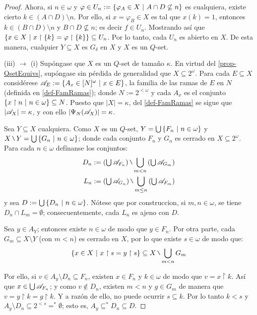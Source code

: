 \begin{proof}
        Ahora, si $n \in \omega$ y $\varphi \in U_n:=\{\varphi_A \in X \text{ $|$ } A \cap D \not\subseteq n\}$ es cualquiera, existe cierto $k \in (A \cap D) \setminus n$. Por ello, si $x=\varphi_B \in X$ es tal que $x(k)=1$, entonces $k \in (B \cap D) \setminus n$ y $B \cap D \not \subseteq n$; es decir $f \in U_n$. Mostrando así que $\{ x \in X \text{ $|$ } x\upharpoonright \{k\} = \varphi \upharpoonright \{k\} \} \subseteq U_n$. Por lo tanto, cada $U_n$ es abierto en $X$. De esta manera, cualquier $Y \subseteq X$ es $G_\delta$ en $X$ y $X$ es un $Q$-set.

        (iii) $\to$ (i) Supóngase que $X$ es un $Q$-set de tamaño $\kappa$. En virtud del \autoref{prop-QsetEquivs}, supóngase sin pérdida de generalidad que $X \subseteq 2^\omega$. Para cada $E \subseteq X$ considérese $ \mathscr{A}_E:=\{ A_x \in [N]^\omega \text{ $|$ } x \in E \} $, la familia de las ramas de $E$ en $N$ (definida en \ref{def-FamRamas}); donde $N:=2^{<\omega}$ y cada $A_x$ es el conjunto $\{x \upharpoonright n \text{ $|$ } n \in \omega\} \subseteq N$. Puesto que $|X|=\kappa$, del \autoref{def-FamRamas} se sigue que $|\mathscr{A}_X|=\kappa$, y con ello $|\Psi_N(\mathscr{A}_X)|=\kappa$.
        
        Sea $Y \subseteq X$ cualquiera. Como $X$ es un $Q$-set, $Y=\mbox{$\bigcup$}\,\{F_n \text{ $|$ } n \in \omega\}$ y $X \setminus Y=\midcup\{G_n \tq n\in \omega\}$; donde cada conjunto $F_n$ y $G_n$ es cerrado en $X\subseteq 2^\omega$. Para cada $n \in \omega$ defínanse los conjuntos:
        \begin{align*}
            D_n := \left( \midcup \ms{A}_{F_n} \right) \setminus \bigcup_{m<n} \left( \midcup \ms{A}_{G_m} \right) \\
            L_n := \left( \midcup \ms{A}_{G_n} \right) \setminus \bigcup_{m\leq n} \left( \midcup \ms{A}_{F_m} \right) 
        \end{align*}
        y sea $D:=\mbox{$\bigcup$}\,\{D_n \text{ $|$ } n \in \omega\}$. Nótese que por construccion, si $m,n \in \omega$, se tiene $D_n \cap L_m = \emptyset$; consecuentemente, cada $L_n$ es ajeno con $D$.

        Sea $y \in A_Y$; entonces existe $n \in \omega$ de modo que $y \in F_n$. Por otra parte, cada $G_m\subseteq X\setminus Y$ (con $m<n$) es cerrado en $X$, por lo que existe $s \in \omega$ de modo que:
        $$ \{ x \in X \tq x \upharpoonright s = y \upharpoonright s \} \subseteq X \setminus \bigcup_{m<n} G_m $$
        
        Por ello, si $v \in A_y \setminus D_n\subseteq F_n$, existen $x \in F_n$ y $k \in \omega$ de modo que $v = x \upharpoonright k$. Así que $x \in \mbox{$\bigcup$}\, \mathscr{A}_{F_n}$; y como $v \notin D_n$, existen $m<n$ y $g \in G_m$ de manera que $v = y \upharpoonright k = g \upharpoonright k$. Y a razón de ello, no puede ocurrir $s \subseteq k$. Por lo tanto $k<s$ y $A_y \setminus D_n \subseteq 2^{<s} =^* \emptyset$; esto es, $A_y \subseteq^* D_n \subseteq D$.


\end{proof}
